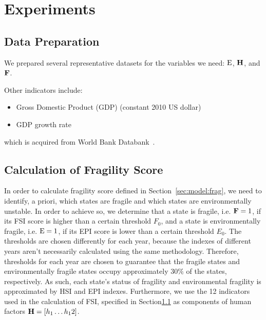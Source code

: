 \section{Experiments}
\label{sec:exp}
\subsection{Data Preparation}
\label{sec:exp:prep}


We prepared several representative datasets for the variables we need: $\operatorname*{E}$, $\operatorname*{\mathbf{H}}$, and $\operatorname*{\mathbf{F}}$.


Other indicators include:
\begin{itemize}
   \item Gross Domestic Product (GDP) (constant 2010 US dollar) 
   \item GDP growth rate
\end{itemize}
which is acquired from World Bank Databank~.

\subsection{Calculation of Fragility Score}
\label{sec:exp:frag}
In order to calculate fragility score defined in Section~\ref{sec:model:frag}, we need to identify, a priori, which states are fragile and which states are environmentally unstable. 
In order to achieve so, we determine that a state is fragile, i.e. $\operatorname*{\mathbf{F}}=1$, if its FSI score is higher than a certain threshold $F_0$, and a state is environmentally fragile, i.e. $\operatorname*{E}=1$, if its EPI score is lower than a certain threshold $E_0$. 
The thresholds are chosen differently for each year, because the indexes of different years aren't necessarily calculated using the same methodology.
Therefore, thresholds for each year are chosen to guarantee that the fragile states and environmentally fragile states occupy approximately $30\%$ of the states, respectively. As such, each state's status of fragility and environmental fragility is approximated by HSI and EPI indexes. Furthermore, we use the 12 indicators used in the calculation of FSI, specified in Section\ref{sec:exp:prep} as components of human factors $\operatorname*{\mathbf{H}} = \left[ h_1\ldots h_12 \right]$.

